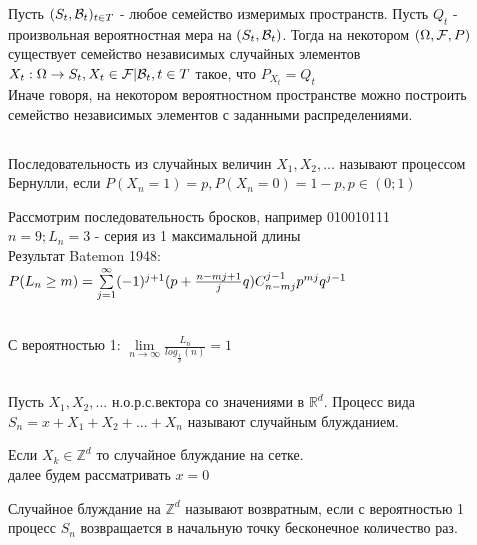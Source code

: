 \begin{teo}
Пусть $(S_t, \mathcal{B}_t)_{t\in T}$ - любое семейство измеримых пространств. Пусть $Q_t$ - произвольная вероятностная мера на $(S_t, \mathcal{B}_t)$. Тогда на некотором $(\Omega, \mathcal{F}, P)$ существует семейство независимых случайных элементов $X_t:\Omega\to S_t, X_t\in \mathcal{F}|\mathcal{B}_t, t\in T$ такое, что $P_{X_t} = Q_t$\\
Иначе говоря, на некотором вероятностном пространстве можно построить семейство независимых элементов с заданными распределениями.
\end{teo}

\subsection{}
\begin{opr}
Последовательность из случайных величин $X_1, X_2, ...$ называют процессом Бернулли, если $P(X_n = 1) = p, P(X_n = 0) = 1-p, p\in(0;1)$
\end{opr}
Рассмотрим последовательность бросков, например 010010111\\
$n=9; L_n=3$ - серия из 1 максимальной длины\\
Результат Batemon 1948:\\
$P(L_n\ge m) = \sum\limits_{j=1}^\infty (-1)^{j+1} (p+\frac{n-mj+1}{j}q) C_{n-mj}^{j-1} p^{mj}q^{j-1}$\\\\


\begin{teo}
С вероятностью 1: $\lim\limits_{n\to\infty}\frac{L_n}{log_{\frac{1}{p}}(n)}= 1$
\end{teo}


\subsection{}
\begin{opr}
Пусть $X_1, X_2, ...$ н.о.р.с.вектора со значениями в $\mathbb{R}^d$. Процесс вида $S_n = x + X_1 + X_2 + ... + X_n$ называют случайным блужданием.
\end{opr}
Если $X_k\in \mathbb{Z}^d$ то случайное блуждание на сетке.\\
далее будем рассматривать $x=0$

\begin{opr}
Случайное блуждание на $\mathbb{Z}^d$ называют возвратным, если с вероятностью 1 процесс $S_n$ возвращается в начальную точку бесконечное количество раз.
\end{opr}

